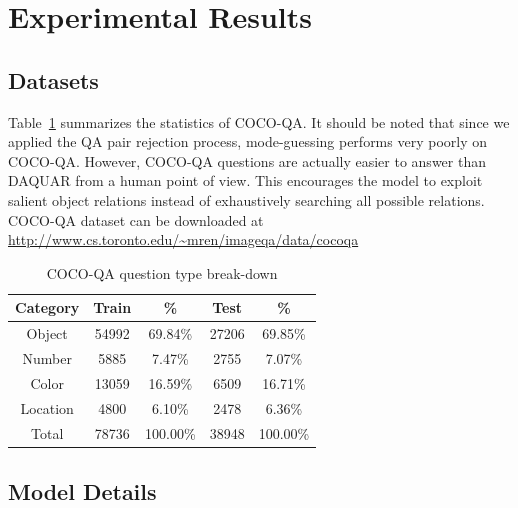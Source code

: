 \documentclass{article}
\renewcommand{\#}[1]{\textbf{#1}}
\begin{document}
\section{Experimental Results}
\subsection{Datasets}
Table~\ref{tab:dataset_category_stats} summarizes the statistics of 
COCO-QA. It should be noted that since we applied the QA pair rejection process, 
mode-guessing performs very poorly on COCO-QA. However, COCO-QA questions 
are actually easier to answer than DAQUAR from a human point of view. This encourages 
the model to exploit salient object relations instead of exhaustively searching
all possible relations. COCO-QA dataset can be downloaded at \url{http://www.cs.toronto.edu/~mren/imageqa/data/cocoqa}

\begin{table}
\caption{COCO-QA question type break-down}
\vskip 0.15in
\label{tab:dataset_category_stats}
\begin{center}
\begin{small}
\begin{sc}
\begin{tabular}{c c c c c}
\hline
\abovespace
\belowspace
Category & Train & \%       & Test  & \%       \\
\hline
\abovespace
Object   & 54992 & 69.84\%  & 27206 & 69.85\%  \\
Number   & 5885  & 7.47\%   & 2755  & 7.07\%   \\
Color    & 13059 & 16.59\%  & 6509  & 16.71\%  \\
\belowspace
Location & 4800  & 6.10\%   & 2478  & 6.36\%   \\
\hline
\abovespace
\belowspace
Total    & 78736 & 100.00\% & 38948 & 100.00\% \\
\hline
\end{tabular}
\end{sc}
\end{small}
\end{center}
\end{table}

\subsection{Model Details}
\end{document}
